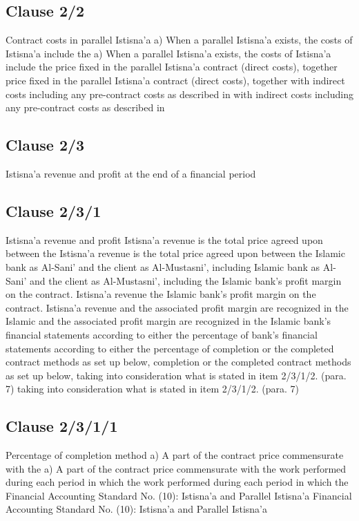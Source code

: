 \documentclass{article}%
\begin{document}
%
\subsection{Clause 2/2}%
\label{subsec:Clause2/2}%
Contract costs in parallel Istisna’a a) When a parallel Istisna’a exists, the costs of Istisna’a include the  a) When a parallel Istisna’a exists, the costs of Istisna’a include the  price fixed in the parallel Istisna’a contract (direct costs), together  price fixed in the parallel Istisna’a contract (direct costs), together  with indirect costs including any pre-contract costs as described in  with indirect costs including any pre-contract costs as described in

%
\subsection{Clause 2/3}%
\label{subsec:Clause2/3}%
Istisna’a revenue and profit at the end of a financial period

%
\subsection{Clause 2/3/1}%
\label{subsec:Clause2/3/1}%
Istisna’a revenue and profit   Istisna’a revenue is the total price agreed upon between the    Istisna’a revenue is the total price agreed upon between the  Islamic bank as Al-Sani’ and the client as Al-Mustasni’, including  Islamic bank as Al-Sani’ and the client as Al-Mustasni’, including  the Islamic bank’s profit margin on the contract. Istisna’a revenue  the Islamic bank’s profit margin on the contract. Istisna’a revenue  and the associated profit margin are recognized in the Islamic  and the associated profit margin are recognized in the Islamic  bank’s financial statements according to either the percentage of  bank’s financial statements according to either the percentage of  completion or the completed contract methods as set up below,  completion or the completed contract methods as set up below,  taking into consideration what is stated in item 2/3/1/2. (para. 7) taking into consideration what is stated in item 2/3/1/2. (para. 7)

%
\subsection{Clause 2/3/1/1}%
\label{subsec:Clause2/3/1/1}%
Percentage of completion method a) A part of the contract price commensurate with the  a) A part of the contract price commensurate with the  work performed during each period in which the  work performed during each period in which the  Financial Accounting Standard No. (10): Istisna’a and Parallel Istisna’a Financial Accounting Standard No. (10): Istisna’a and Parallel Istisna’a
\end{document}
